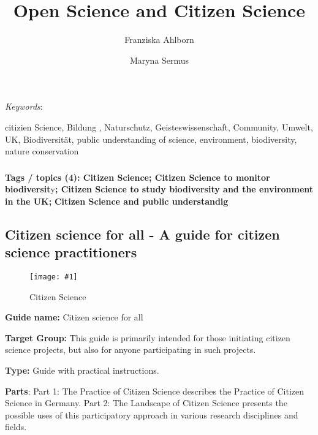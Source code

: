 \documentclass{article}
\def\keywords{\vspace{.5em}
                
{\textit{Keywords}:\,\relax%
                
}}
\newcommand{\sep}{, }
\newlength{\imgwidth}
\newcommand\scaledgraphics[2]{%
                
\settowidth{\imgwidth}{\texttt{[image: \#1]}}%
                
\setlength{\imgwidth}{\minof{\imgwidth}{#2\textwidth}}%
                
\texttt{[image: \#1]}%
                
}
\begin{document}
\title{Open Science and Citizen Science}

\maketitle

\author{Franziska Ahlborn}
\author{Maryna Sermus}
\affil{}


\keywords{citizien Science\sep Bildung \sep Naturschutz\sep Geisteswissenschaft\sep Community\sep Umwelt\sep UK\sep Biodiversität\sep public understanding of science\sep environment\sep biodiversity\sep nature conservation}

\subsubsection{}\label{H1731420}



\textbf{Tags / topics (4): Citizen Science; Citizen Science to monitor biodiversit}y\textbf{; Citizen Science to study biodiversity and the environment in the UK;} \textbf{Citizen Science and public understandig}


\subsection{Citizen science for all - A guide for citizen science practitioners}\label{H2662301}



\begin{center}
\begin{figure}
\scaledgraphics{3cbbd8ed-7495-46a8-8cb5-114cf95cfb83.png}{0.75}
\caption*{Citizen Science}\label{F38618731}
\end{figure}


\end{center}





\textbf{Guide name:} Citizen science for all \autocite{noauthor_citizen_2016}


\textbf{Target Group: }This guide is primarily intended for those initiating citizen science projects, but also for anyone participating in such projects.


\textbf{Type: }Guide with practical instructions.


\textbf{Parts}:  Part 1: The Practice of Citizen Science describes the Practice of Citizen Science in Germany. Part 2: The Landscape of Citizen Science presents the possible uses of this participatory approach in various research disciplines and fields.
\end{document}
